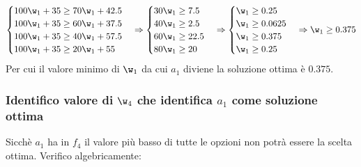 \documentclass[\main/main.tex]{subfiles}
\begin{document}
\[
  \begin{cases}
    100\w_1 + 35 \geq 70\w_1 + 42.5 \\
    100\w_1 + 35 \geq 60\w_1 + 37.5 \\
    100\w_1 + 35 \geq 40\w_1 + 57.5 \\
    100\w_1 + 35 \geq 20\w_1 + 55   \\
  \end{cases}
  \Rightarrow
  \begin{cases}
    30\w_1 \geq 7.5  \\
    40\w_1 \geq 2.5  \\
    60\w_1 \geq 22.5 \\
    80\w_1 \geq 20   \\
  \end{cases}
  \Rightarrow
  \begin{cases}
    \w_1 \geq 0.25   \\
    \w_1 \geq 0.0625 \\
    \w_1 \geq 0.375  \\
    \w_1 \geq 0.25   \\
  \end{cases}
  \Rightarrow
  \w_1 \geq 0.375
\]
Per cui il valore minimo di $\w_1$ da cui $a_1$ diviene la soluzione ottima è $0.375$.

\subsubsection*{Identifico valore di $\w_4$ che identifica $a_1$ come soluzione ottima}
Sicchè $a_1$ ha in $f_4$ il valore più basso di tutte le opzioni non potrà essere la scelta ottima. Verifico algebricamente:
\end{document}

